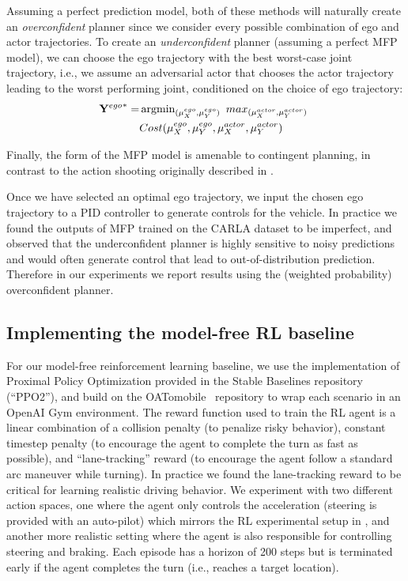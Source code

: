 Assuming a perfect prediction model, both of these methods will naturally create an \emph{overconfident} planner since we consider every possible combination of ego and actor trajectories. To create an \emph{underconfident} planner (assuming a perfect MFP model), we can choose the ego trajectory with the best worst-case joint trajectory, i.e., we assume an adversarial actor that chooses the actor trajectory leading to the worst performing joint, conditioned on the choice of ego trajectory:
\begin{equation}
\begin{aligned}
    {\mathbf{Y}^{ego}}^\ast = 
    & \operatorname{argmin}_{(\mu^{ego}_X,\mu^{ego}_Y)}~
     max_{(\mu^{actor}_X,\mu^{actor}_Y)}~
    \\& Cost(\mu^{ego}_X,\mu^{ego}_Y,\mu^{actor}_X,\mu^{actor}_Y)
\end{aligned}
\end{equation}

Finally, the form of the MFP model is amenable to contingent planning, in contrast to the action shooting originally described in \cite{tang2019mfp}. 

Once we have selected an optimal ego trajectory, we input the chosen ego trajectory to a PID controller to generate controls for the vehicle. In practice we found the outputs of MFP trained on the CARLA dataset to be imperfect, and observed that the underconfident planner is highly sensitive to noisy predictions and would often generate control that lead to out-of-distribution prediction. Therefore in our experiments we report results using the (weighted probability) overconfident planner.

\subsection{Implementing the model-free RL baseline} \label{app:model_free}
For our model-free reinforcement learning baseline, we use the implementation of Proximal Policy Optimization provided in the Stable Baselines repository~\citep{stable-baselines} (``PPO2''), and build on the OATomobile~\citep{filos2020can} repository to wrap each scenario in an OpenAI Gym environment.
The reward function used to train the RL agent is a linear combination of a collision penalty (to penalize risky behavior), constant timestep penalty (to encourage the agent to complete the turn as fast as possible), and ``lane-tracking'' reward (to encourage the agent follow a standard arc maneuver while turning). In practice we found the lane-tracking reward to be critical for learning realistic driving behavior.
We experiment with two different action spaces, one where the agent only controls the acceleration (steering is provided with an auto-pilot) which mirrors the RL experimental setup in \cite{tang2019mfp}, and another more realistic setting where the agent is also responsible for controlling steering and braking.
Each episode has a horizon of 200 steps but is terminated early if the agent completes the turn (i.e., reaches a target location).

